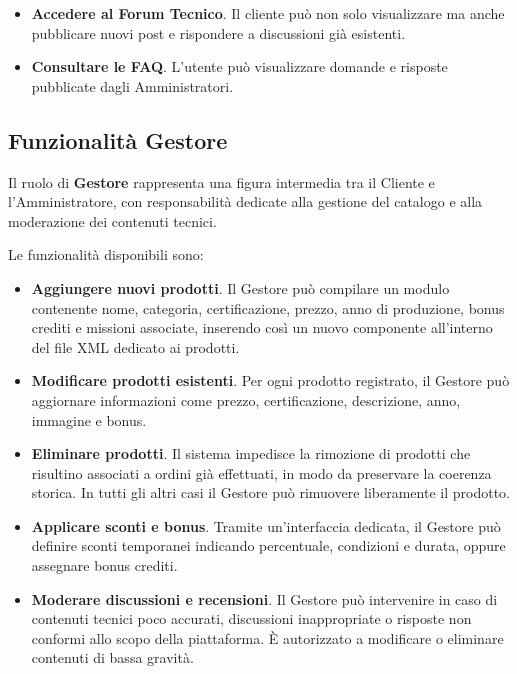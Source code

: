 \documentclass[a4paper,12pt]{report}
\begin{document}
\begin{itemize}
    \item \textbf{Accedere al Forum Tecnico}.  
    Il cliente può non solo visualizzare ma anche pubblicare nuovi post
    e rispondere a discussioni già esistenti.

    \item \textbf{Consultare le FAQ}.  
    L’utente può visualizzare domande e risposte pubblicate dagli Amministratori.
\end{itemize}

\subsection{Funzionalità Gestore}
\label{sec:gestore}

Il ruolo di \textbf{Gestore} rappresenta una figura intermedia tra il Cliente e l’Amministratore, con responsabilità dedicate alla gestione
del catalogo e alla moderazione dei contenuti tecnici.

Le funzionalità disponibili sono:

\begin{itemize}
    \item \textbf{Aggiungere nuovi prodotti}.  
    Il Gestore può compilare un modulo contenente nome, categoria,
    certificazione, prezzo, anno di produzione, bonus crediti e missioni associate,
    inserendo così un nuovo componente all’interno del file XML dedicato ai prodotti.

    \item \textbf{Modificare prodotti esistenti}.  
    Per ogni prodotto registrato, il Gestore può aggiornare informazioni
    come prezzo, certificazione, descrizione, anno, immagine e bonus.

    \item \textbf{Eliminare prodotti}.  
    Il sistema impedisce la rimozione di prodotti che risultino associati
    a ordini già effettuati, in modo da preservare la coerenza storica.
    In tutti gli altri casi il Gestore può rimuovere liberamente il prodotto.

    \item \textbf{Applicare sconti e bonus}.  
    Tramite un’interfaccia dedicata, il Gestore può definire sconti temporanei
    indicando percentuale, condizioni e durata, oppure assegnare bonus crediti.

    \item \textbf{Moderare discussioni e recensioni}.  
    Il Gestore può intervenire in caso di contenuti tecnici poco accurati,
    discussioni inappropriate o risposte non conformi allo scopo della piattaforma.
    È autorizzato a modificare o eliminare contenuti di bassa gravità.

\end{itemize}
\end{document}
